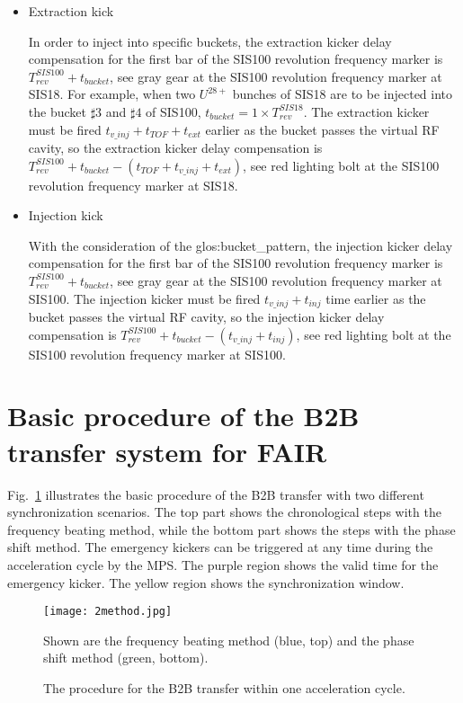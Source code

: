 \begin{itemize}
\item Extraction kick

In order to inject into specific buckets, the extraction kicker delay compensation for the first bar of the SIS100 revolution frequency marker is $T_{rev}^{SIS100} + t_{bucket}$, see gray gear at the SIS100 revolution frequency marker at SIS18. For example, when two $U^{28+}$ bunches of SIS18 are to be injected into the bucket $\sharp3$ and $\sharp4$ of SIS100, $t_{bucket} =1 \times T_{rev}^{SIS18}$. The extraction kicker must be fired $t_{v\_inj}+t_{TOF}+t_{ext}$ earlier as the bucket passes the virtual RF cavity, so the extraction kicker delay compensation is $T_{rev}^{SIS100} + t_{bucket} - (t_{TOF} + t_{v\_inj} + t_{ext})$, see red lighting bolt at the SIS100 revolution frequency marker at SIS18. 

\item Injection kick

With the consideration of the \gls{glos:bucket_pattern}, the injection kicker delay compensation for the first bar of the SIS100 revolution frequency marker is $T_{rev}^{SIS100} + t_{bucket}$, see gray gear at the SIS100 revolution frequency marker at SIS100. The injection kicker must be fired $t_{v\_inj}+t_{inj}$ time earlier as the bucket passes the virtual RF cavity, so the injection kicker delay compensation is $T_{rev}^{SIS100} + t_{bucket} - (t_{v\_inj} + t_{inj})$, see red lighting bolt at the SIS100 revolution frequency marker at SIS100.
\end{itemize}

\section{Basic procedure of the B2B transfer system for FAIR}

Fig.~\ref{2method} illustrates the basic procedure of the B2B transfer with two different synchronization scenarios. The top part shows the chronological steps with the frequency beating method, while the bottom part shows the steps with the phase shift method. The emergency kickers can be triggered at any time during the acceleration cycle by the MPS. The purple region shows the valid time for the emergency kicker. The yellow region shows the synchronization window. 
\begin{figure}[H]
   \centering   
   \texttt{[image: 2method.jpg]}
   \caption{The procedure for the B2B transfer within one acceleration cycle.}{Shown are the frequency beating method (blue, top) and the phase shift method (green, bottom).}
   \label{2method}
\end{figure}

